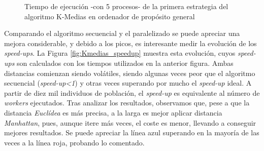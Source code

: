 \begin{figure}[!h]
	\centering
	\caption{Tiempo de ejecución -con 5 procesos- de la primera estrategia del algoritmo K-Medias en ordenador de propósito general}
	\label{fig:KMedias}
\end{figure}


Comparando el algoritmo secuencial y el paralelizado se puede apreciar una mejora considerable, y debido a los picos, es interesante medir la evolución de los \textit{speed-ups}. La Figura \ref{fig:Kmedias_speedup} muestra esta evolución, cuyos \textit{speed-ups} son calculados con los tiempos utilizados en la anterior figura. Ambas distancias comienzan siendo volátiles, siendo algunas veces peor que el algoritmo secuencial (\textit{speed-up<1}) y otras veces superando por mucho el \textit{speed-up} ideal. A partir de diez mil individuos de población, el \textit{speed-up} es equivalente al número de \textit{workers} ejecutados. Tras analizar los resultados, observamos que, pese a que la distancia \textit{Euclídea} es más precisa, a la larga es mejor aplicar distancia \textit{Manhattan}, pues, aunque itere más veces, el coste es menor, llevando a conseguir mejores resultados. Se puede apreciar la línea azul superando en la mayoría de las veces a la línea roja, probando lo comentado.




